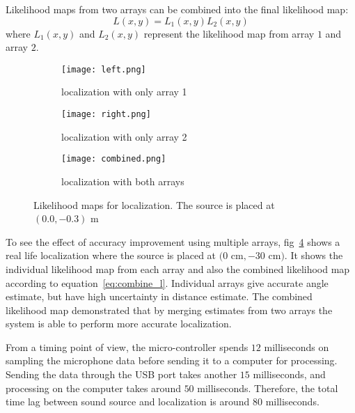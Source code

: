 Likelihood maps from two arrays can be combined into the final likelihood map:
\begin{equation}\label{eq:combine_l}
L(x,y) = L_1(x,y) L_2(x,y)
\end{equation}
where $L_1(x,y)$ and $L_2(x,y)$ represent the likelihood map from array $1$ and array $2$.

\begin{figure}[]
  \centering
  \begin{subfigure}[]{.48\textwidth}
    \texttt{[image: left.png]}
    \caption{localization with only array 1}
    \label{fig:liklihood1}
  \end{subfigure}
  \begin{subfigure}[]{.48\textwidth}
    \texttt{[image: right.png]}
    \caption{localization with only array 2}
    \label{fig:liklihood2}
  \end{subfigure}
  \begin{subfigure}[]{.48\textwidth}
    \texttt{[image: combined.png]}
    \caption{localization with both arrays}
    \label{fig:liklihood3}
  \end{subfigure}
  \caption{Likelihood maps for localization. The source is placed at $(0.0,-0.3)$ m}
  \label{fig:liklihood}
\end{figure}

To see the effect of accuracy improvement using multiple arrays, fig~\ref{fig:liklihood} shows a real life localization where the source is placed at $(0$ cm$,-30$ cm$)$. It shows the individual likelihood map from each array and also the combined likelihood map according to equation~\ref{eq:combine_l}. Individual arrays give accurate angle estimate, but have high uncertainty in distance estimate. The combined likelihood map demonstrated that by merging estimates from two arrays the system is able to perform more accurate localization. 

From a timing point of view, the micro-controller spends $12$ milliseconds on sampling the microphone data before sending it to a computer for processing. Sending the data through the USB port takes another $15$ milliseconds, and processing on the computer takes around $50$ milliseconds. Therefore, the total time lag between sound source and localization is around $80$ milliseconds.
